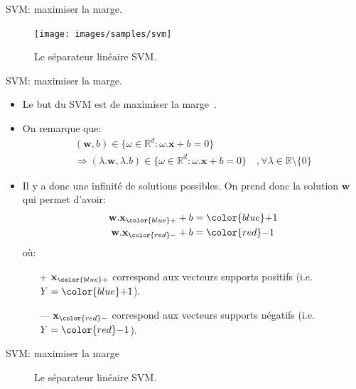 \documentclass[8pt]{beamer}
\begin{document}
		\begin{frame}{SVM\@: maximiser la marge.}
			\begin{figure}[H]
				\texttt{[image: images/samples/svm]}
				\caption*{ Le séparateur linéaire SVM.}
			\end{figure}
		\end{frame}

		\begin{frame}{SVM\@: maximiser la marge.}
			\begin{itemize}
				\item  Le but du SVM est de maximiser la marge~\cite{vapnik1998statistical}.
				\item  On remarque que:
				\begin{gather*}
					(\textbf{w}, b) \in \{\omega \in \mathbb{R}^d : \omega.\textbf{x} + b = 0\} \\
					\Rightarrow
					(\lambda . \textbf{w}, \lambda.b) \in \{\omega \in \mathbb{R}^d : \omega.\textbf{x} + b = 0\}\quad, \forall \lambda \in \mathbb{R}\setminus\{0\}
				\end{gather*}
				\item  Il y a donc une infinité de solutions possibles. On prend donc la solution $\textbf{w}$ qui permet d'avoir:
				\begin{align}
					\textbf{w}.\textbf{x}_{\color{blue}+} + b &= {\color{blue}+}1 \\
					\textbf{w}.\textbf{x}_{\color{red}-} + b &= {\color{red}-}1
				\end{align}
				où:
				\begin{itemize}
					\item[{\color{blue}+}] $\textbf{x}_{\color{blue}+}$ correspond aux vecteurs supports positifs (i.e. $Y={\color{blue}+}1$).
					\item[{\color{red}---}] $\textbf{x}_{\color{red}-}$ correspond aux vecteurs supports négatifs (i.e. $Y={\color{red}-}1$).
				\end{itemize}
			\end{itemize}
		\end{frame}

		\begin{frame}[plain]{SVM\@: maximiser la marge}
			\begin{figure}[H]
				
				\caption*{\tiny Le séparateur linéaire SVM.}
			\end{figure}
		\end{frame}
\end{document}
